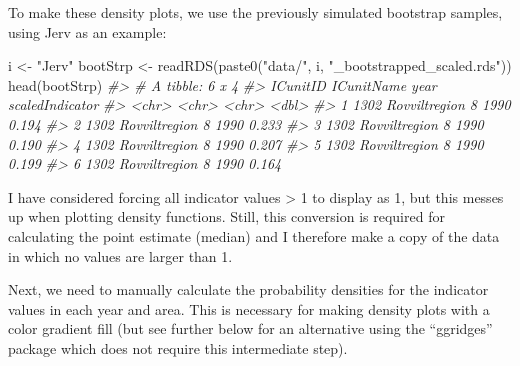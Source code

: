 \documentclass[
]{book}
\newenvironment{Shaded}{\begin{snugshade}}{\end{snugshade}}
\newcommand{\CommentTok}[1]{\textcolor[rgb]{0.56,0.35,0.01}{\textit{#1}}}
\newcommand{\DecValTok}[1]{\textcolor[rgb]{0.00,0.00,0.81}{#1}}
\newcommand{\FunctionTok}[1]{\textcolor[rgb]{0.00,0.00,0.00}{#1}}
\newcommand{\NormalTok}[1]{#1}
\newcommand{\OtherTok}[1]{\textcolor[rgb]{0.56,0.35,0.01}{#1}}
\newcommand{\SpecialCharTok}[1]{\textcolor[rgb]{0.00,0.00,0.00}{#1}}
\newcommand{\StringTok}[1]{\textcolor[rgb]{0.31,0.60,0.02}{#1}}
\begin{document}
To make these density plots, we use the previously simulated bootstrap samples, using Jerv as an example:

\begin{Shaded}
\begin{Highlighting}[]

\NormalTok{i }\OtherTok{\textless{}{-}} \StringTok{"Jerv"}
\NormalTok{bootStrp }\OtherTok{\textless{}{-}} \FunctionTok{readRDS}\NormalTok{(}\FunctionTok{paste0}\NormalTok{(}\StringTok{"data/"}\NormalTok{, i, }\StringTok{"\_bootstrapped\_scaled.rds"}\NormalTok{))}
\FunctionTok{head}\NormalTok{(bootStrp)}
\CommentTok{\#\textgreater{} \# A tibble: 6 x 4}
\CommentTok{\#\textgreater{}   ICunitID ICunitName      year  scaledIndicator}
\CommentTok{\#\textgreater{}   \textless{}chr\textgreater{}    \textless{}chr\textgreater{}           \textless{}chr\textgreater{}           \textless{}dbl\textgreater{}}
\CommentTok{\#\textgreater{} 1 1302     Rovviltregion 8 1990            0.194}
\CommentTok{\#\textgreater{} 2 1302     Rovviltregion 8 1990            0.233}
\CommentTok{\#\textgreater{} 3 1302     Rovviltregion 8 1990            0.190}
\CommentTok{\#\textgreater{} 4 1302     Rovviltregion 8 1990            0.207}
\CommentTok{\#\textgreater{} 5 1302     Rovviltregion 8 1990            0.199}
\CommentTok{\#\textgreater{} 6 1302     Rovviltregion 8 1990            0.164}
\end{Highlighting}
\end{Shaded}

I have considered forcing all indicator values \textgreater{} 1 to display as 1, but this messes up when plotting density functions. Still, this conversion is required for calculating the point estimate (median) and I therefore make a copy of the data in which no values are larger than 1.

\begin{Shaded}
\end{Shaded}

Next, we need to manually calculate the probability densities for the indicator values in each year and area. This is necessary for making density plots with a color gradient fill (but see further below for an alternative using the ``ggridges'' package which does not require this intermediate step).
\end{document}
